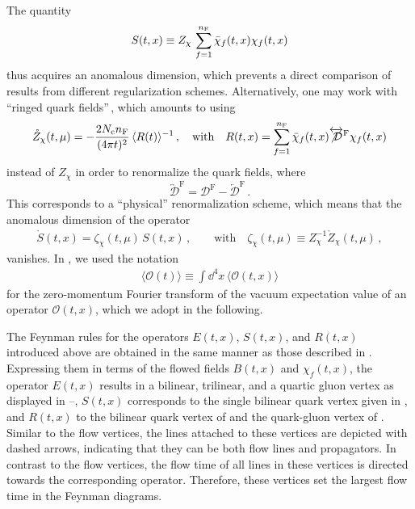 The quantity
\begin{align}
  S (t,x) \equiv Z_\chi\,\sum_{f=1}^{n_\mathrm{F}}\bar{\chi}_f(t,x) \chi_f(t,x)
  \label{eq:def_S}
\end{align}
thus acquires an anomalous dimension, which prevents a direct comparison
of results from different regularization schemes. Alternatively, one may
work with ``ringed quark fields''\,\cite{Makino:2014taa}, which amounts to using
\begin{equation}
  \begin{split}
    \mathring{Z}_\chi(t,\mu) = -\frac{2N_\mathrm{c} n_\mathrm{F}}{(4\pi t)^2}\, \langle
    R(t)\rangle^{-1}\,,\quad\mbox{with}\quad R(t,x) =
    \sum_{f=1}^{n_\mathrm{F}}\bar{\chi}_f(t,x) \overleftrightarrow{\not{\mathcal{D}}}^\mathrm{F} \chi_f(t,x)
  \label{eq:Zring}
  \end{split}
\end{equation}
instead of $Z_\chi$ in order to renormalize the quark fields, where
\begin{equation}
  \overleftrightarrow{\mathcal{D}}^\mathrm{F} = \mathcal{D}^\mathrm{F} - \overleftarrow{\mathcal{D}}^\mathrm{F} \,.
\end{equation}
This
corresponds to a ``physical'' renormalization scheme, which means that
the anomalous dimension of the operator
\begin{equation}
  \begin{split}
    \mathring{S}(t,x) = \zeta_\chi(t,\mu)\,S(t,x)\,,\qquad\mbox{with}\quad
    \zeta_\chi(t,\mu) \equiv Z_\chi^{-1}\mathring{Z}_\chi(t,\mu)\,,
    \label{eq:zetachi}
  \end{split}
\end{equation}
vanishes. In , we used the notation
\begin{equation}
  \begin{split}
    \langle \mathcal{O}(t)\rangle \equiv \int\dd^4 x\,
    \langle \mathcal{O}(t,x)\rangle
  \end{split}
\end{equation}
for the zero-momentum Fourier transform of the vacuum expectation value
of an operator $\mathcal{O}(t,x)$, which we adopt in the following.

The Feynman rules for the operators $E(t,x)$, $S(t,x)$, and $R(t,x)$
introduced above are obtained in the same manner as those described in
. Expressing them in terms of the flowed fields
$B(t,x)$ and $\chi_f(t,x)$, the operator $E(t,x)$ results in a bilinear,
trilinear, and a quartic gluon vertex as displayed in
--, $S(t,x)$ corresponds to the single
bilinear quark vertex given in , and $R(t,x)$ to the
bilinear quark vertex of  and the quark-gluon vertex of
. Similar to the flow vertices, the lines attached to
these vertices are depicted with dashed arrows, indicating that they can
be both flow lines and propagators.  In contrast to the flow vertices,
the flow time of all lines in these vertices is directed towards the
corresponding operator.  Therefore, these vertices set the largest flow
time in the Feynman diagrams.


